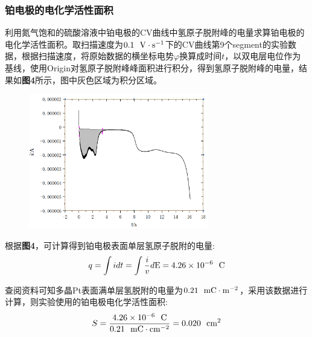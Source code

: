 \documentclass[12pt]{article}
\begin{document}
			\subsubsection{铂电极的电化学活性面积}
			利用氮气饱和的硫酸溶液中铂电极的CV曲线中氢原子脱附峰的电量求算铂电极的电化学活性面积。取扫描速度为$0.1\ \ {\rm V\cdot s^{-1}}$下的CV曲线第9个segment的实验数据，根据扫描速度，将原始数据的横坐标电势$\varphi$换算成时间$t$，以双电层电位作为基线，使用Origin对氢原子脱附峰峰面积进行积分，得到氢原子脱附峰的电量，结果如\textbf{图4}所示，图中灰色区域为积分区域。\par
			\begin{figure}[h]
				\centering
				\includegraphics[width=0.7\textwidth]{4.png}
			\end{figure}
			\par
			根据\textbf{图4}，可计算得到铂电极表面单层氢原子脱附的电量:
			$$
			q=\int i dt= \int \frac{i}{v}d{\rm E}= 4.26\times10^{-6}\ \ {\rm C}
			$$
			\par
			查阅资料\citealp{physchemlab}可知多晶Pt表面满单层氢脱附的电量为$0.21\ \ {\rm mC\cdot m^{-2}}$，采用该数据进行计算，则实验使用的铂电极电化学活性面积:
			$$
			S=\frac{4.26\times10^{-6}\ \ {\rm C}}{0.21\ \ {\rm mC\cdot cm^{-2}}}=0.020\ \ {\rm cm^{2}}
			$$
\end{document}
